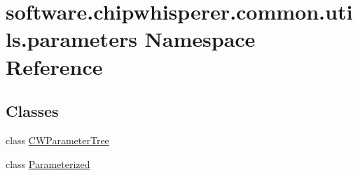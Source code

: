\hypertarget{namespacesoftware_1_1chipwhisperer_1_1common_1_1utils_1_1parameters}{}\section{software.\+chipwhisperer.\+common.\+utils.\+parameters Namespace Reference}
\label{namespacesoftware_1_1chipwhisperer_1_1common_1_1utils_1_1parameters}
\subsection*{Classes}
\begin{DoxyCompactItemize}
\item 
class \hyperlink{classsoftware_1_1chipwhisperer_1_1common_1_1utils_1_1parameters_1_1CWParameterTree}{C\+W\+Parameter\+Tree}
\item 
class \hyperlink{classsoftware_1_1chipwhisperer_1_1common_1_1utils_1_1parameters_1_1Parameterized}{Parameterized}
\end{DoxyCompactItemize}
